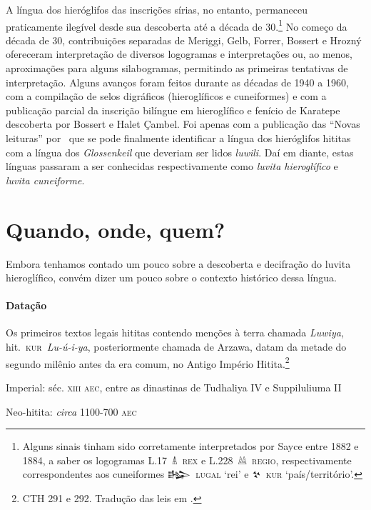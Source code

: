 A língua dos hieróglifos das inscrições sírias, no entanto, permaneceu
praticamente ilegível desde sua descoberta até a década de 30.\footnote{Alguns
	sinais tinham sido corretamente interpretados por Sayce entre 1882 e 1884, a
	saber os logogramas \mbox{L.17 𔐑 \textsc{rex}} e \mbox{L.228 𔔆 \textsc{regio}},
	respectivamente correspondentes aos cuneiformes
	\mbox{\foreignlanguage{hittite}{𒈗} \textsc{lugal}} `rei' e \mbox{\foreignlanguage{hittite}{𒆳} \textsc{kur}}
	`país\slash{}território'.}
No começo da década de 30, contribuições separadas de Meriggi, Gelb, Forrer,
Bossert e Hrozný ofereceram interpretação de diversos logogramas e
interpretações ou, ao menos, aproximações para alguns silabogramas,
permitindo as primeiras tentativas de interpretação.
Alguns avanços foram feitos durante as décadas de 1940 a 1960, com a compilação
de selos digráficos (hieroglíficos e cuneiformes) e com a publicação parcial da
inscrição bilíngue em hieroglífico e fenício de Karatepe descoberta por
Bossert e Halet Çambel.
Foi apenas com a publicação das ``Novas leituras''
por~\textcite{HawkinsMorpurgoNeumann1974} que se pode finalmente identificar a
língua dos hieróglifos hititas com a língua dos
\emph{\foreignlanguage{german}{Glossenkeil}} que deveriam
ser lidos \emph{luwili}.
Daí em diante, estas línguas passaram a ser conhecidas respectivamente como
\emph{luvita hieroglífico} e \emph{luvita cuneiforme}.

\section{Quando, onde, quem?}

Embora tenhamos contado um pouco sobre a descoberta e decifração do luvita
hieroglífico, convém dizer um pouco sobre o contexto histórico dessa língua.

\paragraph{Datação} Os primeiros textos legais hititas contendo menções à
terra chamada \emph{Luwiya}, hit.\ \mbox{\textsc{kur} \textit{Lu-ú-i-ya}},
posteriormente chamada de Arzawa, datam da metade do segundo milênio antes da 
era comum, no Antigo Império Hitita.\footnote{CTH 291 e 292. Tradução das leis 
em \textcite{Hoffner1997}.}


\begin{compactenum}
\item Imperial: séc. \textsc{xiii aec}, entre as dinastinas de Tudhaliya IV e
Suppiluliuma II
\item Neo-hitita: \emph{circa} 1100-700 \textsc{aec}
\end{compactenum}
%
